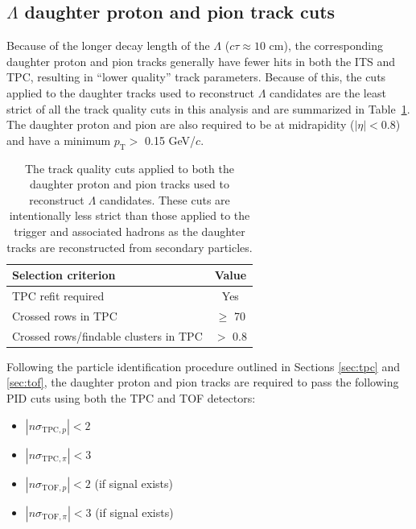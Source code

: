 \subsection{$\Lambda$ daughter proton and pion track cuts}

Because of the longer decay length of the $\Lambda$ ($c\tau \approx 10$ cm), the corresponding daughter proton and pion tracks generally have fewer hits in both the ITS and TPC, resulting in ``lower quality'' track parameters. Because of this, the cuts applied to the daughter tracks used to reconstruct $\Lambda$ candidates are the least strict of all the track quality cuts in this analysis and are summarized in Table~\ref{tab:lambda_daughter_track_cuts}. The daughter proton and pion are also required to be at midrapidity ($|\eta| < 0.8$) and have a minimum $p_{\text{T}} >$ 0.15 GeV/$c$. 

\begin{table}[h]
	\centering
	\caption{The track quality cuts applied to both the daughter proton and pion tracks used to reconstruct $\Lambda$ candidates. These cuts are intentionally less strict than those applied to the trigger and associated hadrons as the daughter tracks are reconstructed from secondary particles.}
	\label{tab:lambda_daughter_track_cuts}
	\begin{tabular}{ l  c }
		\hline
		Selection criterion & Value \\
		\hline
		TPC refit required & Yes \\
		Crossed rows in TPC & $\geq$ 70 \\
		Crossed rows/findable clusters in TPC & $>$ 0.8 \\
		\hline
	\end{tabular}
\end{table}

Following the particle identification procedure outlined in Sections \ref{sec:tpc} and \ref{sec:tof}, the daughter proton and pion tracks are required to pass the following PID cuts using both the TPC and TOF detectors:

\begin{itemize}
	\item $|n\sigma_{\text{TPC}, p}| < 2$
	\item $|n\sigma_{\text{TPC}, \pi}| < 3$
	\item $|n\sigma_{\text{TOF}, p}| < 2$ (if signal exists)
	\item $|n\sigma_{\text{TOF}, \pi}| < 3$ (if signal exists)
\end{itemize}

